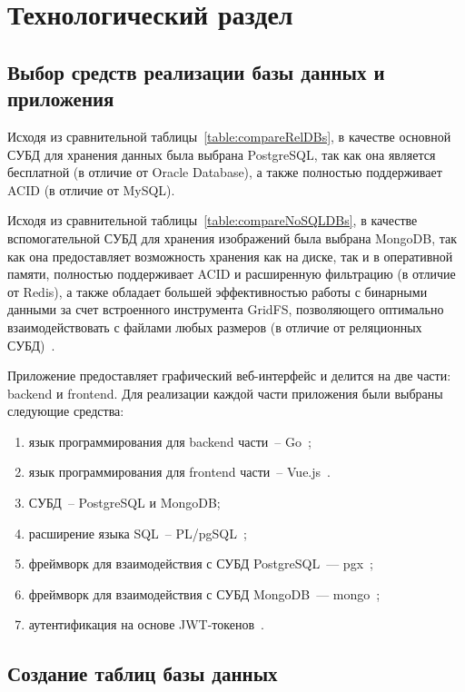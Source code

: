 \chapter{Технологический раздел}

\section{Выбор средств реализации базы данных и приложения}

Исходя из сравнительной таблицы~\ref{table:compareRelDBs}, в качестве основной СУБД для хранения данных была выбрана PostgreSQL, так как она является бесплатной (в отличие от Oracle Database), а также полностью поддерживает ACID (в отличие от MySQL).

Исходя из сравнительной таблицы~\ref{table:compareNoSQLDBs}, в качестве вспомогательной СУБД для хранения изображений была выбрана MongoDB, так как она предоставляет возможность хранения как на диске, так и в оперативной памяти, полностью поддерживает ACID и расширенную фильтрацию (в отличие от Redis), а также обладает большей эффективностью работы с бинарными данными за счет встроенного инструмента GridFS, позволяющего оптимально взаимодействовать с файлами любых размеров (в отличие от реляционных СУБД)~\cite{cmpNosqlSCDB, cmpStoreBinary, cmpStoreBinary1}.

Приложение предоставляет графический веб-интерфейс и делится на две части: backend и frontend.
Для реализации каждой части приложения были выбраны следующие средства:
\begin{enumerate}
	\item язык программирования для backend части~-- Go~\cite{go};
	\item язык программирования для frontend части~-- Vue.js~\cite{vue}.
	\item СУБД~-- PostgreSQL и MongoDB;
	\item расширение языка SQL~-- PL/pgSQL~\cite{plpg};
	\item фреймворк для взаимодействия с СУБД PostgreSQL~--- pgx~\cite{pgx};
	\item фреймворк для взаимодействия с СУБД MongoDB~--- mongo~\cite{mongogo};
	\item аутентификация на основе JWT-токенов~\cite{jwt}.
\end{enumerate}

\clearpage

\section{Создание таблиц базы данных}

